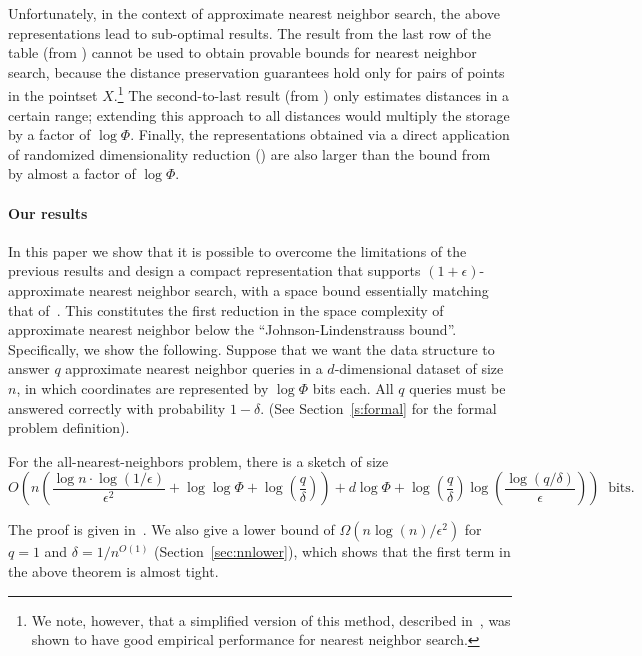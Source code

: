 Unfortunately,  in the context of approximate nearest neighbor search, the above representations lead to sub-optimal results. 
The result from the last row of the table (from \cite{indyk2017near}) cannot be used to obtain provable bounds for nearest neighbor search, because the distance preservation guarantees hold only for pairs of points in the pointset $X$.\footnote{We note, however, that a simplified version of this method, described in~\cite{indyk2017practical}, was shown to have  good empirical performance for nearest neighbor search.} 
The second-to-last result (from \cite{kushilevitz2000efficient}) only estimates distances in a certain range; extending this approach to all distances would multiply the storage by a factor of $\log \Phi$.  Finally,  the representations obtained via a direct application of  randomized dimensionality reduction (\cite{johnson1984extensions}) are also larger than the bound from~\cite{indyk2017near} by almost a factor of $\log \Phi$. 

\paragraph{Our results} In this paper we show that it is possible to overcome the limitations of the previous results and design a compact representation that supports $(1+\epsilon)$-approximate nearest neighbor search, with a space bound essentially matching that of~\cite{indyk2017near}. This constitutes the first reduction in the space complexity of approximate nearest neighbor below the  ``Johnson-Lindenstrauss bound''.
Specifically, we show the following. Suppose that we want the data structure to answer $q$ approximate nearest neighbor queries in a $d$-dimensional dataset of size $n$, in which coordinates are represented by $\log\Phi$ bits each.
All $q$ queries must be answered correctly with probability $1-\delta$. (See Section~\ref{s:formal} for the formal problem definition).

\begin{theorem}\label{thm:ann_ub}
For the all-nearest-neighbors problem, there is a sketch of size 
\[
  O\left( n\left(\frac{\log n\cdot\log(1/\epsilon)}{\epsilon^2} + \log\log\Phi + \log\left(\frac{q}{\delta}\right)\right) + d\log\Phi  + \log\left(\frac{q}{\delta}\right)\log\left(\frac{\log(q/\delta)}{\epsilon}\right) \right)
  \;\; \text{bits.}
\]
\end{theorem}
The proof is given in~. We also give a lower bound of
 $\Omega(n \log(n) /\epsilon^2)$ for $q=1$ and $\delta=1/n^{O(1)}$ (Section~\ref{sec:nnlower}), which shows that the first term in the above theorem is almost tight. 
 
